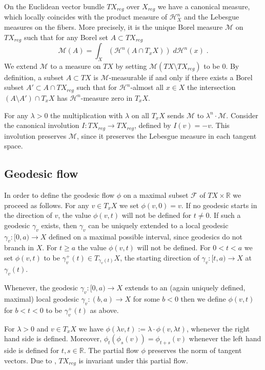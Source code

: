 \documentclass[12pt,leqno,intlimits]{amsart}
\numberwithin{equation}{section}
\theoremstyle{definition}
\theoremstyle{remark}
\newcommand{\R}{\mathbb{R}}
\def\:{\colon}
\begin{document}
 On the Euclidean vector bundle $TX_{reg}$ over $X_{reg}$ we have a canonical measure, which locally coincides with the product measure of $\mathcal H^n _X$ and the Lebesgue measures on the fibers. More precisely,
 it is the unique Borel measure $\mathcal M$ on $TX_{reg}$ such that for any  Borel set $A\subset TX_{reg}$
 $$\mathcal M(A)= \int _X (\mathcal H^n(A \cap T_x X)) \; d\mathcal H^n (x) \; .$$
 We extend $\mathcal M$ to a measure on $TX$ by setting $\mathcal M(TX\setminus TX_{reg})$ to be $0$.
By definition, a subset $A\subset TX$ is $\mathcal M$-measurable if and only if there exists  a Borel subset $A'\subset A\cap TX_{reg}$ such that
for $\mathcal H^n$-almost all $x\in X$ the intersection $(A\setminus A') \cap T_xX$ has $\mathcal H^n$-measure zero in $T_xX$.




 For any $\lambda >0$ the multiplication with $\lambda$  on all $T_xX$ sends $\mathcal M $ to $\lambda ^n \cdot \mathcal M$.
 Consider the canonical involution $I\:TX_{reg}\to TX_{reg}$, defined by $I(v)=-v$.
This involution preserves $\mathcal M$, since it preserves the Lebesgue measure in each tangent space.


\subsection{Geodesic flow}
   In order to define the geodesic flow $\phi$ on a maximal subset   $\mathcal F$ of $TX \times \R $  we proceed as follows.
 For any  $v\in  T_xX$ we set $\phi (v,0)=v$.
 If no geodesic starts in the direction of $v$,
 the value $\phi (v,t)$ will not be defined for $t\neq 0$. If such a geodesic $\gamma_v$ exists, then $\gamma_v$   can be uniquely extended to a  local geodesic $\gamma_v \:[0,a)\to X$  defined on a maximal possible interval, since  geodesics do not branch in $X$.  For $t\geq a$
 the value $\phi (v,t)$ will not be defined. For $0<t<a$ we set $\phi (v,t)$ to be $\gamma _v ^+ (t) \in T_{\gamma _v(t)} X$, the starting direction of $\gamma_v\:[t,a) \to X$ at $\gamma_v (t)$.

 Whenever, the geodesic $\gamma _v\:[0,a)\to X$ extends to an (again uniquely defined, maximal)  local geodesic   $\gamma_v\:(b,a) \to X$ for some $b<0$
 then we define $\phi (v,t)$ for $b<t<0$ to be $\gamma_v ^+ (t) $ as above.


For $\lambda >0$ and $v\in  T_x X$ we have  $\phi (\lambda v,t) :=\lambda \cdot \phi (v,\lambda t)$, whenever the right hand side is defined. Moreover,
 $\phi _t ( \phi _s (v))= \phi _{t+s} (v)$ whenever the left hand side is defined for $t,s\in \R$.
The partial flow $\phi$ preserves the norm of tangent vectors.  Due to \cite{Petparallel},  $TX_{reg}$ is invariant under this partial flow.
\end{document}
